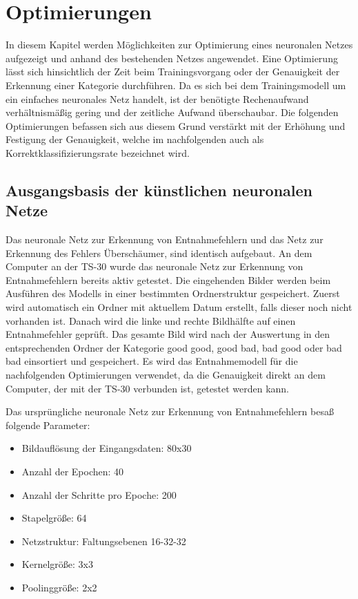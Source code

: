 %
%



\chapter{Optimierungen}

In diesem Kapitel werden Möglichkeiten zur Optimierung eines neuronalen Netzes aufgezeigt
und anhand des bestehenden Netzes angewendet. Eine Optimierung lässt sich
hinsichtlich der Zeit beim Trainingsvorgang oder der Genauigkeit der Erkennung einer
Kategorie durchführen. Da es sich bei dem Trainingsmodell um ein einfaches neuronales
Netz handelt, ist der benötigte Rechenaufwand verhältnismäßig gering und der zeitliche
Aufwand überschaubar. Die folgenden Optimierungen befassen sich aus diesem Grund
verstärkt mit der Erhöhung und Festigung der Genauigkeit, welche im nachfolgenden
auch als Korrektklassifizierungsrate bezeichnet wird.

\section{Ausgangsbasis der künstlichen neuronalen Netze}

Das neuronale Netz zur Erkennung von Entnahmefehlern und das Netz zur Erkennung des
Fehlers Überschäumer, sind identisch aufgebaut. An dem Computer an der TS-30 wurde
das neuronale Netz zur Erkennung von Entnahmefehlern bereits aktiv getestet. Die 
eingehenden Bilder werden beim Ausführen des Modells in einer bestimmten Ordnerstruktur
gespeichert. Zuerst wird automatisch ein Ordner mit aktuellem Datum erstellt, falls dieser
noch nicht vorhanden ist. Danach wird die linke und rechte Bildhälfte auf einen 
Entnahmefehler geprüft. Das gesamte Bild wird nach der Auswertung in den entsprechenden
Ordner der Kategorie good good, good bad, bad good oder bad bad einsortiert und 
gespeichert. Es wird das Entnahmemodell für die nachfolgenden Optimierungen verwendet,
da die Genauigkeit direkt an dem Computer, der mit der TS-30 verbunden ist, getestet
werden kann.

Das ursprüngliche neuronale Netz zur Erkennung von Entnahmefehlern besaß folgende
Parameter:

\begin{itemize}
  \item Bildauflösung der Eingangsdaten: 80x30
  \item Anzahl der Epochen: 40
  \item Anzahl der Schritte pro Epoche: 200
  \item Stapelgröße: 64
  \item Netzstruktur: Faltungsebenen 16-32-32
  \item Kernelgröße: 3x3
  \item Poolinggröße: 2x2
\end{itemize}
	
